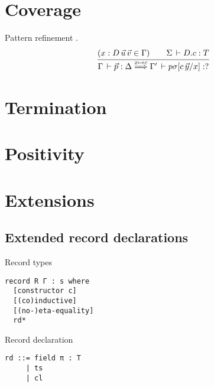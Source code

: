 \documentclass[acmlarge,fleqn]{acmart}\settopmatter{}
\begin{document}
\section{Coverage}
\label{sec:coverage}

Pattern refinement
.
\begin{gather*}
  \ru{(x : D\,\vec u\,\vec v \in \Gamma) \qquad \Sigma \der D.c : T
    }{\Gamma \der \vec p : \Delta \prefine x c \Gamma' \der p \sigma [c\,\vec y / x] : ?}
\end{gather*}

\section{Termination}
\label{sec:termination}

\section{Positivity}
\label{sec:positivity}

\section{Extensions}
\label{sec:extensions}

\subsection{Extended record declarations}

Record types
\begin{verbatim}
record R Γ : s where
  [constructor c]
  [(co)inductive]
  [(no-)eta-equality]
  rd*
\end{verbatim}

Record declaration
\begin{verbatim}
rd ::= field π : T
     | ts
     | cl
\end{verbatim}


\begin{acks}                            %
\end{acks}


%


\fi
\end{document}
